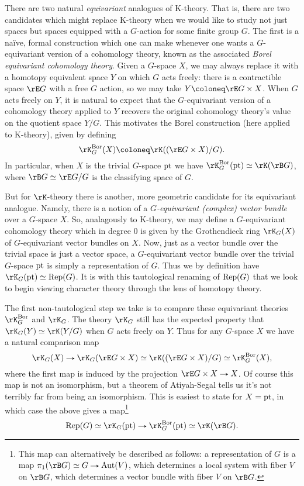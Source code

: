 There are two natural \emph{equivariant} analogues of K-theory. That
is, there are two candidates which might replace K-theory when we
would like to study not just spaces but spaces equipped with a
$G$-action for some finite group $G$. The first is a na\"ive, formal
construction which one can make whenever one wants a $G$-equivariant
version of a cohomology theory, known as the associated \emph{Borel
  equivariant cohomology theory}. Given a $G$-space $X$, we may always
replace it with a homotopy equivalent space $Y$ on which $G$ acts
freely: there is a contractible space $\rE G$ with a free $G$ action,
so we may take $Y \ce \rE G \times X$. When $G$ acts freely on $Y$, it
is natural to expect that the $G$-equivariant version of a cohomology
theory applied to $Y$ recovers the original cohomology theory's value
on the quotient space $Y/G$. This motivates the Borel construction
(here applied to K-theory), given by defining
\[
\rK^\Bor_G(X) \ce \rK((\rE G \times X)/G).
\]
In particular, when $X$ is the trivial $G$-space $\mathrm{pt}$ we have
$\rK^\Bor_G(\pt) \iso \rK(\rB G)$, where $\rB G \iso \rE G / G$ is the
classifying space of $G$.

But for $\rK$-theory there is another, more geometric candidate for
its equivariant analogue. Namely, there is a notion of a
\emph{$G$-equivariant (complex) vector bundle} over a $G$-space
$X$. So, analagously to K-theory, we may define a $G$-equivariant
cohomology theory which in degree $0$ is given by the Grothendieck
ring $\rK_G(X)$ of $G$-equivariant vector bundles on $X$. Now, just as
a vector bundle over the trivial space is just a vector space, a
$G$-equivariant vector bundle over the trivial $G$-space $\mathrm{pt}$ is
simply a representation of $G$. Thus we by definition have
$\rK_G(\pt) \iso \Rep(G)$. It is with this tautological renaming of
$\operatorname{Rep}(G)$ that we look to begin viewing character theory through the
lens of homotopy theory.

The first non-tautological step we take is to compare these
equivariant theories $\rK^\Bor_G$ and $\rK_G$. The theory $\rK_G$
still has the expected property that $\rK_G(Y) \iso \rK(Y/G)$ when $G$
acts freely on $Y$. Thus for any $G$-space $X$ we have a natural
comparison map
\[
\rK_G(X) \to
\rK_G(\rE G \times X) \iso
\rK((\rE G \times X)/G) \iso
\rK^\Bor_G(X),
\]
where the first map is induced by the projection
$\rE G \times X \to X$. Of course this map is not an isomorphism, but
a theorem of Atiyah-Segal tells us it's not terribly far from being an
isomorphism. This is easiest to state for $X = \mathrm{pt}$, in which case the
above gives a map\footnote{This map can alternatively be described as
  follows: a representation of $G$ is a map
  $\pi_1(\rB G) \iso G \to \Aut(V)$, which determines a local system
  with fiber $V$ on $\rB G$, which determines a vector bundle with
  fiber $V$ on $\rB G$.}
\begin{equation}
  \label{intro-atsegmap}
  \Rep(G) \iso \rK_G(\pt) \to \rK^\Bor_G(\pt) \iso \rK(\rB G).
\end{equation}

